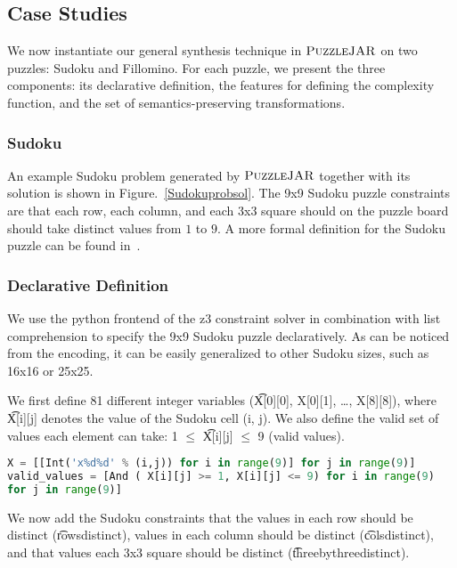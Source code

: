 \subsection{Case Studies}

We now instantiate our general synthesis technique in $\textsc{PuzzleJAR}$ on
two puzzles: Sudoku and Fillomino. For each puzzle, we present the
three components: its declarative definition, the features for
defining the complexity function, and the set of semantics-preserving
transformations.


\subsubsection{Sudoku}

An example Sudoku problem generated by $\textsc{PuzzleJAR}$ together with its
solution is shown in Figure.~\ref{Sudokuprobsol}. The 9x9 Sudoku puzzle constraints are that each row, each column, and each 3x3 square should on the puzzle board should take distinct values from $1$ to $9$. A more formal definition for the Sudoku puzzle can be found in~\cite{Sudokudef}.

\subsubsection*{Declarative Definition}
We use the python frontend of the z3 constraint solver in combination
with list comprehension to specify the 9x9 Sudoku puzzle
declaratively. As can be noticed from the encoding, it can be easily
generalized to other Sudoku sizes, such as 16x16 or 25x25.

We first define 81 different integer variables (\t{X[0][0], X[0][1], \ldots,
X[8][8]}), where \t{X[i][j]} denotes the value of the Sudoku cell (i, j). We
also define the valid set of values each element can take: 1 $\leq$
\t{X[i][j]} $\leq$ 9 (valid values).

\singlespace
\begin{lstlisting}[language=python, frame = single]
X = [[Int('x%d%d' % (i,j)) for i in range(9)] for j in range(9)]
valid_values = [And ( X[i][j] >= 1, X[i][j] <= 9) for i in range(9)
for j in range(9)]
\end{lstlisting}
\doublespace

We now add the Sudoku constraints that the values in each row should be
distinct (\t{rows\textunderscore distinct}), values in each column should be distinct
(\t{cols\textunderscore distinct}), and that values each 3x3 square should be distinct
(\t{three\textunderscore by\textunderscore three\textunderscore distinct}).


